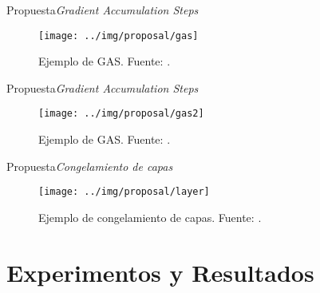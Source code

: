 \documentclass[10pt]{beamer}
\newcommand{\1}{
	\setbeamertemplate{background}{
		\texttt{[image: img/1]}
		\tikz[overlay] \fill[fill opacity=0.75,fill=white] (0,0) rectangle (-\paperwidth,\paperheight);
	}
}
\begin{document}
\begin{frame}{Propuesta}{\textit{Gradient Accumulation Steps}}
		\begin{figure}
		\centering
		\texttt{[image: ../img/proposal/gas]}	
		\caption{Ejemplo de GAS. Fuente: \cite{prince2023understanding}.}		
	\end{figure}
\end{frame}

\begin{frame}{Propuesta}{\textit{Gradient Accumulation Steps}}
	\begin{figure}
		\centering
		\texttt{[image: ../img/proposal/gas2]}	
		\caption{Ejemplo de GAS. Fuente: \cite{gas2023}.}		
	\end{figure}
\end{frame}

\begin{frame}{Propuesta}{\textit{Congelamiento de capas}}
		\begin{figure}
		\centering
		\texttt{[image: ../img/proposal/layer]}	
		\caption{Ejemplo de congelamiento de capas. Fuente: \cite{layerf2023}.}		
	\end{figure}
\end{frame}



\section{Experimentos y Resultados}
\end{document}
